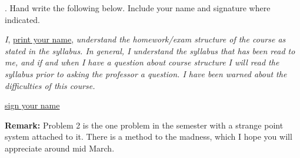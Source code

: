 \documentclass[12pt]{article}
\begin{document}
.  Hand write the following below.  Include your name and signature where indicated.   
\vspace{.15in}

\noindent \textit{I}, \underline{print your name}, \textit{ understand the homework/exam structure of the course as stated in the syllabus.  In general, I understand the syllabus that has been read to me, and if and when I have a question about course structure I will read the syllabus prior to asking the professor a question.  I have been warned about the difficulties of this course.}
\vspace{.15in}

\noindent \underline{sign your name}
\vspace{.15in}

\noindent \textbf{Remark:}  Problem 2 is the one problem in the semester with a strange point system attached to it.  There is a method to the madness, which I hope you will appreciate around mid March.  
\end{document}
